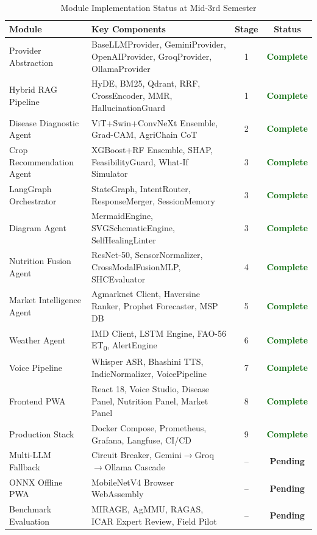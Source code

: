 \documentclass[12pt,a4paper]{article}
\begin{document}
\begin{table}[htbp]
\centering
\small
\setlength{\tabcolsep}{4pt}
\caption{Module Implementation Status at Mid-3rd Semester}
\label{tab:status}
\begin{tabularx}{\textwidth}{|>{\raggedright\arraybackslash}p{3.2cm}|>{\raggedright\arraybackslash}X|c|c|}
\hline
\textbf{Module} & \textbf{Key Components} & \textbf{Stage} & \textbf{Status} \\
\hline
Provider Abstraction & BaseLLMProvider, GeminiProvider, OpenAIProvider, GroqProvider, OllamaProvider & 1 & \textcolor{darkGreen}{\textbf{Complete}} \\
\hline
Hybrid RAG Pipeline & HyDE, BM25, Qdrant, RRF, CrossEncoder, MMR, HallucinationGuard & 1 & \textcolor{darkGreen}{\textbf{Complete}} \\
\hline
Disease Diagnostic Agent & ViT+Swin+ConvNeXt Ensemble, Grad-CAM, AgriChain CoT & 2 & \textcolor{darkGreen}{\textbf{Complete}} \\
\hline
Crop Recommendation Agent & XGBoost+RF Ensemble, SHAP, FeasibilityGuard, What-If Simulator & 3 & \textcolor{darkGreen}{\textbf{Complete}} \\
\hline
LangGraph Orchestrator & StateGraph, IntentRouter, ResponseMerger, SessionMemory & 3 & \textcolor{darkGreen}{\textbf{Complete}} \\
\hline
Diagram Agent & MermaidEngine, SVGSchematicEngine, SelfHealingLinter & 3 & \textcolor{darkGreen}{\textbf{Complete}} \\
\hline
Nutrition Fusion Agent & ResNet-50, SensorNormalizer, CrossModalFusionMLP, SHCEvaluator & 4 & \textcolor{darkGreen}{\textbf{Complete}} \\
\hline
Market Intelligence Agent & Agmarknet Client, Haversine Ranker, Prophet Forecaster, MSP DB & 5 & \textcolor{darkGreen}{\textbf{Complete}} \\
\hline
Weather Agent & IMD Client, LSTM Engine, FAO-56 ET\textsubscript{0}, AlertEngine & 6 & \textcolor{darkGreen}{\textbf{Complete}} \\
\hline
Voice Pipeline & Whisper ASR, Bhashini TTS, IndicNormalizer, VoicePipeline & 7 & \textcolor{darkGreen}{\textbf{Complete}} \\
\hline
Frontend PWA & React 18, Voice Studio, Disease Panel, Nutrition Panel, Market Panel & 8 & \textcolor{darkGreen}{\textbf{Complete}} \\
\hline
Production Stack & Docker Compose, Prometheus, Grafana, Langfuse, CI/CD & 9 & \textcolor{darkGreen}{\textbf{Complete}} \\
\hline
Multi-LLM Fallback & Circuit Breaker, Gemini$\to$Groq$\to$Ollama Cascade & -- & \textcolor{warningOrange}{\textbf{Pending}} \\
\hline
ONNX Offline PWA & MobileNetV4 Browser WebAssembly & -- & \textcolor{warningOrange}{\textbf{Pending}} \\
\hline
Benchmark Evaluation & MIRAGE, AgMMU, RAGAS, ICAR Expert Review, Field Pilot & -- & \textcolor{warningOrange}{\textbf{Pending}} \\
\hline
\end{tabularx}
\end{table}
\end{document}
